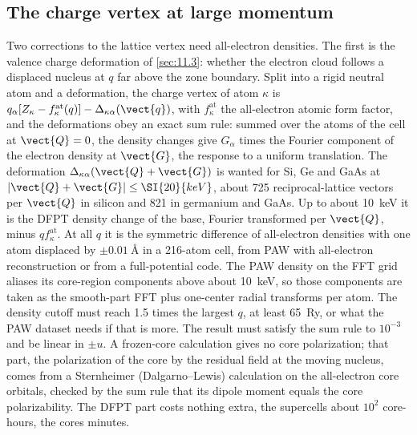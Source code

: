 \subsection{The charge vertex at large momentum}

Two corrections to the lattice vertex need all-electron densities. The first is the valence charge deformation of \cref{sec:11.3}: whether the electron cloud follows a displaced nucleus at $q$ far above the zone boundary. Split into a rigid neutral atom and a deformation, the charge vertex of atom $\kappa$ is $q_\alpha[Z_\kappa - f^{\mathrm{at}}_\kappa(q)] - \Delta_{\kappa\alpha}(\vect{q})$, with $f^{\mathrm{at}}_\kappa$ the all-electron atomic form factor, and the deformations obey an exact sum rule: summed over the atoms of the cell at $\vect{Q} = 0$, the density changes give $G_\alpha$ times the Fourier component of the electron density at $\vect{G}$, the response to a uniform translation. The deformation $\Delta_{\kappa\alpha}(\vect{Q}+\vect{G})$ is wanted for Si, Ge and GaAs at $|\vect{Q}+\vect{G}| \le \SI{20}{keV}$, about 725 reciprocal-lattice vectors per $\vect{Q}$ in silicon and 821 in germanium and GaAs. Up to about \SI{10}{keV} it is the DFPT density change of the base, Fourier transformed per $\vect{Q}$, minus $q f^{\mathrm{at}}_\kappa$. At all $q$ it is the symmetric difference of all-electron densities with one atom displaced by $\pm\SI{0.01}{\angstrom}$ in a 216-atom cell, from PAW with all-electron reconstruction or from a full-potential code. The PAW density on the FFT grid aliases its core-region components above about \SI{10}{keV}, so those components are taken as the smooth-part FFT plus one-center radial transforms per atom. The density cutoff must reach 1.5 times the largest $q$, at least \SI{65}{Ry}, or what the PAW dataset needs if that is more. The result must satisfy the sum rule to $10^{-3}$ and be linear in $\pm u$. A frozen-core calculation gives no core polarization; that part, the polarization of the core by the residual field at the moving nucleus, comes from a Sternheimer (Dalgarno--Lewis) calculation on the all-electron core orbitals, checked by the sum rule that its dipole moment equals the core polarizability. The DFPT part costs nothing extra, the supercells about $10^2$ core-hours, the cores minutes.

